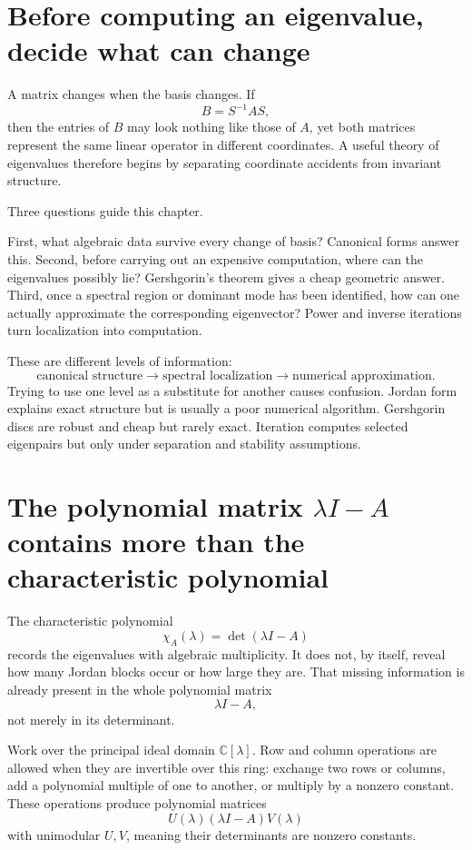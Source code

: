 
\section{Before computing an eigenvalue, decide what can change}

A matrix changes when the basis changes.  If
\[
  B=S^{-1}AS,
\]
then the entries of \(B\) may look nothing like those of \(A\), yet both matrices represent the same linear operator in different coordinates.  A useful theory of eigenvalues therefore begins by separating coordinate accidents from invariant structure.

Three questions guide this chapter.

First, what algebraic data survive every change of basis?  Canonical forms answer this.  Second, before carrying out an expensive computation, where can the eigenvalues possibly lie?  Gershgorin's theorem gives a cheap geometric answer.  Third, once a spectral region or dominant mode has been identified, how can one actually approximate the corresponding eigenvector?  Power and inverse iterations turn localization into computation.

These are different levels of information:
\[
  \text{canonical structure}
  \longrightarrow
  \text{spectral localization}
  \longrightarrow
  \text{numerical approximation}.
\]
Trying to use one level as a substitute for another causes confusion.  Jordan form explains exact structure but is usually a poor numerical algorithm.  Gershgorin discs are robust and cheap but rarely exact.  Iteration computes selected eigenpairs but only under separation and stability assumptions.

\section{The polynomial matrix \texorpdfstring{$\lambda I-A$}{lambda I minus A} contains more than the characteristic polynomial}

The characteristic polynomial
\[
  \chi_A(\lambda)=\det(\lambda I-A)
\]
records the eigenvalues with algebraic multiplicity.  It does not, by itself, reveal how many Jordan blocks occur or how large they are.  That missing information is already present in the whole polynomial matrix
\[
  \lambda I-A,
\]
not merely in its determinant.

Work over the principal ideal domain \(\mathbb C[\lambda]\).  Row and column operations are allowed when they are invertible over this ring: exchange two rows or columns, add a polynomial multiple of one to another, or multiply by a nonzero constant.  These operations produce polynomial matrices
\[
  U(\lambda)(\lambda I-A)V(\lambda)
\]
with unimodular \(U,V\), meaning their determinants are nonzero constants.

